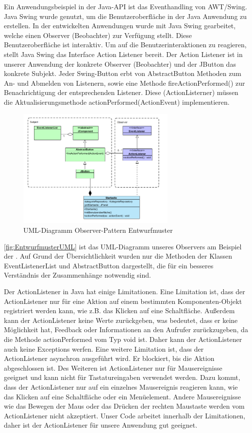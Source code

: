 Ein Anwendungsbeispiel in der Java-API ist das Eventhandling von AWT/Swing. Java Swing wurde genutzt, um die Benutzeroberfläche in der Java Anwendung zu erstellen. In der entwickelten Anwendungen wurde mit Java Swing gearbeitet, welche einen Observer (Beobachter) zur Verfügung stellt. Diese Benutzeroberfläche ist interaktiv. Um auf die Benutzerinteraktionen zu reagieren, stellt Java Swing das Interface Action Listener bereit. Der Action Listener ist in unserer Anwendung der konkrete Observer (Beobachter) und der JButton das konkrete Subjekt. Jeder Swing-Button erbt von AbstractButton Methoden zum An- und Abmelden von Listenern, sowie eine Methode fireActionPerformed() zur Benachrichtigung der entsprechenden Listener. Diese (ActionListerner) müssen die Aktualisierungsmethode actionPerformed(ActionEvent) implementieren.
\begin{figure}[ht]
	\centering
	\includegraphics[width=0.70\textwidth]{Bilder/Entwurfsmuster-UML.png} 
	\caption{UML-Diagramm Observer-Pattern Entwurfmuster}
	\label{fig:EntwurfmusterUML}
\end{figure}
\autoref{fig:EntwurfmusterUML} ist das UML-Diagramm unseres Observers am Beispiel der \href{https://github.com/MichaelaHaag/RezeptApp/blob/main/0-Plugins/src/main/java/de/rezeptapp/plugins/gui/Startseite.java}{}. 
Auf Grund der Übersichtlichkeit wurden nur die Methoden der Klassen EventListenerList und AbstractButton dargestellt, die für ein besseres Verständnis der Zusammenhänge notwendig sind. 

Der ActionListener in Java hat einige Limitationen. Eine Limitation ist, dass der ActionListener nur für eine Aktion auf einem bestimmten Komponenten-Objekt registriert werden kann, wie z.B. das Klicken auf eine Schaltfläche. Außerdem kann der ActionListener keine Werte zurückgeben, was bedeutet, dass er keine Möglichkeit hat, Feedback oder Informationen an den Aufrufer zurückzugeben, da die Methode actionPerformed vom Typ void ist. Daher kann der ActionListener auch keine Exceptions werfen.
Eine weitere Limitation ist, dass der ActionListener asynchron ausgeführt wird. Er blockiert, bis die Aktion abgeschlossen ist.
Des Weiteren ist ActionListener nur für Mausereignisse geeignet und kann nicht für Tastatureingaben verwendet werden. Dazu kommt, dass der ActionListener nur auf ein einzelnes Mausereignis reagieren kann, wie das Klicken auf eine Schaltfläche oder ein Menüelement. Andere Mausereignisse wie das Bewegen der Maus oder das Drücken der rechten Maustaste werden vom ActionListener nicht akzeptiert. Unser Code arbeitet innerhalb der Limitationen, daher ist der ActionListener für unsere Anwendung gut geeignet. 